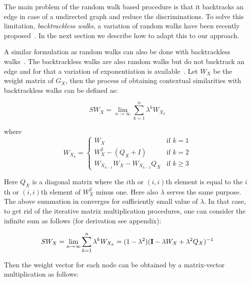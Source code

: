 The main problem of the random walk based procedure is that it backtracks an edge in case of a undirected graph and reduce the discriminations. To solve this limitation, \emph{backtrackless walks}, a variation of random walks have been recently proposed~\cite{Aziz2013}. In the next section we describe how to adapt this to our approach.

A similar formulation as random walks can also be done with backtrackless walks~\cite{Aziz2013}. The backtrackless walks are also random walks but do not backtrack an edge and for that a variation of exponentiation is available~\cite{Stark1996}. Let $W_X$ be the weight matrix of $G_X$, then the process of obtaining contextual similarities with backtrackless walks can be defined as:

\begin{equation}
SW_X=\lim_{n\rightarrow \infty}\sum_{k=1}^n \lambda^k W_{X_k}
\label{eqn:pg:btlw1}
\end{equation}

where
\begin{equation}
W_{X_k} =
\begin{cases}
	W_X					& \text{if } k = 1 \\
	W_X^2-(Q_X+I)			& \text{if } k = 2 \\
   	W_{X_{k-1}}W_X-W_{X_{k-2}}Q_X   	& \text{if } k\geq 3
\end{cases}
\label{eqn:pg:btlw2}
\end{equation}

Here $Q_X$ is a diagonal matrix where the $i$th or $(i,i)$th element is equal to the $i$th or $(i,i)$th element of $W_X^2$ minus one. Here also $\lambda$ serves the same purpose. The above summation in  converges for sufficiently small value of $\lambda$. In that case, to get rid of the iterative matrix multiplication procedures, one can consider the infinite sum as follows (for derivation see appendix):

\begin{equation}
SW_X=\lim_{n\rightarrow \infty}\sum_{k=1}^n \lambda^k W_{X_k}=(1-\lambda^2)(\mathbf{I} - \lambda W_X+\lambda^{2} Q_X)^{-1}
\label{eqn:pg:btlw3}
\end{equation}

Then the weight vector for each node can be obtained by a matrix-vector multiplication as follows:

